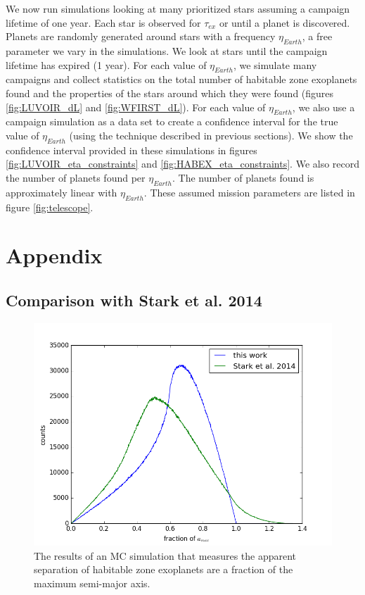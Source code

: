 \documentclass{article}
\begin{document}
	
	We now run simulations looking at many prioritized stars assuming a campaign lifetime of one year. Each star is observed for $\tau_{ex}$ or until a planet is discovered. Planets are randomly generated around stars with a frequency $\eta_{Earth}$, a free parameter we vary in the simulations. We look at stars until the campaign lifetime has expired (1 year). For each value of $\eta_{Earth}$, we simulate many campaigns and collect statistics on the total number of habitable zone exoplanets found and the properties of the stars around which they were found (figures \ref{fig:LUVOIR_dL} and \ref{fig:WFIRST_dL}). 
	For each value of $\eta_{Earth}$, we also use a campaign simulation as a data set to create a confidence interval for the true value of $\eta_{Earth}$ (using the technique described in previous sections). We show the confidence interval provided in these simulations in figures \ref{fig:LUVOIR_eta_constraints} and \ref{fig:HABEX_eta_constraints}. We also record the number of planets found per $\eta_{Earth}$. The number of planets found is approximately linear with $\eta_{Earth}$. These assumed mission parameters are listed in figure \ref{fig:telescope}.
	
	\section{Appendix}
	\subsection{Comparison with Stark et al. 2014}
	
	\begin{figure}
		\includegraphics[width = \linewidth]{stark_compare.png}
		\caption{The results of an MC simulation that measures the apparent separation of habitable zone exoplanets are a fraction of the maximum semi-major axis.}
		\label{fig:stark_compare}
	\end{figure}
	
\end{document}

